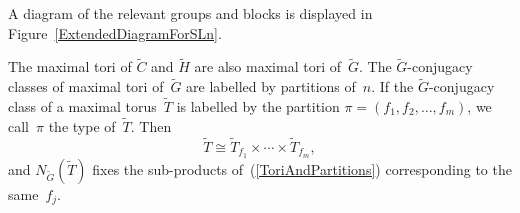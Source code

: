 \documentclass[12pt]{amsart}
\theoremstyle{theorem}
\theoremstyle{definition}
\theoremstyle{remark}
\begin{document}
A diagram of the relevant groups and blocks is displayed in 
Figure~\ref{ExtendedDiagramForSLn}.

The maximal tori of $\tilde{C}$ and $\tilde{H}$ are also maximal tori 
of~$\tilde{G}$. The $\tilde{G}$-conjugacy classes of maximal tori of~$\tilde{G}$
are labelled by partitions of~$n$. If the $\tilde{G}$-conjugacy class of a 
maximal torus~$\tilde{T}$ is labelled by the partition 
$\pi = (f_1, f_2, \ldots , f_m)$, we call~$\pi$ the type of~$\tilde{T}$.
Then 
\begin{equation}
\label{ToriAndPartitions}
\tilde{T} \cong \tilde{T}_{f_1} \times \cdots \times \tilde{T}_{f_m}, 
\end{equation}
and
$N_{\tilde{G}}( \tilde{T} )$ fixes the sub-products of~(\ref{ToriAndPartitions})
corresponding to the same~$f_j$.
\end{document}
